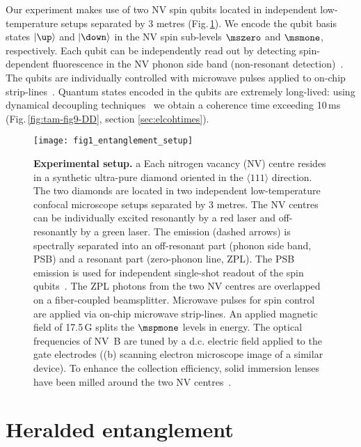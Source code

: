 Our experiment makes use of two NV spin qubits located in independent low-temperature setups separated by 3 metres (Fig.\,\ref{fig:LDE-fig1-setup}). We encode the qubit basis states $\ket{\up}$ and $\ket{\down}$ in the NV spin sub-levels $\mszero$ and $\msmone$, respectively. Each qubit can be independently read out by detecting spin-dependent fluorescence in the NV phonon side band (non-resonant detection)~\cite{Robledo_Nature_2011}. The qubits are individually controlled with microwave pulses applied to on-chip strip-lines~\cite{Lange_Science_2010}. Quantum states encoded in the qubits are extremely long-lived: using dynamical decoupling techniques~\cite{Lange_Science_2010} we obtain a coherence time exceeding 10$\,$ms (Fig.\,\ref{fig:tam-fig9-DD}, section \ref{sec:elcohtimes}).

\begin{figure}[tp]
	\centering
	\texttt{[image: fig1\_entanglement\_setup]}
	\caption{\label{fig:LDE-fig1-setup} \textbf{Experimental setup.} a Each nitrogen vacancy (NV) centre resides in a synthetic ultra-pure diamond oriented in the $\langle 111\rangle$ direction. The two diamonds are located in two independent low-temperature confocal microscope setups separated by 3 metres. The NV centres can be individually excited resonantly by a red laser and off-resonantly by a green laser. The emission (dashed arrows) is spectrally separated into an off-resonant part (phonon side band, PSB) and a resonant part (zero-phonon line, ZPL). The PSB emission is used for independent single-shot readout of the spin qubits~\cite{Robledo_Nature_2011}. The ZPL photons from the two NV centres are overlapped on a fiber-coupled beamsplitter. Microwave pulses for spin control are applied via on-chip microwave strip-lines. An applied magnetic field of 17.5\,G splits the $\mspmone$ levels in energy. The optical frequencies of NV~B are tuned by a d.c. electric field applied to the gate electrodes ((b) scanning electron microscope image of a similar device). To enhance the collection efficiency, solid immersion lenses have been milled around the two NV centres~\cite{Robledo_Nature_2011}. }
\end{figure}

	
\section{Heralded entanglement}\label{sec:HE}

